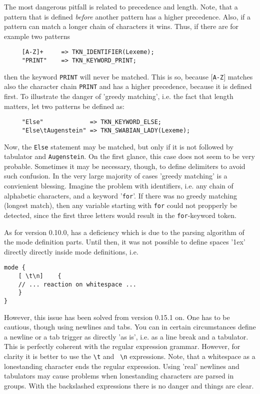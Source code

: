The most dangerous pitfall is related to precedence and length. Note, that a 
pattern that is defined {\it before} another pattern has a higher
precedence. Also, if a pattern can match a longer chain of characters it wins.
Thus, if there are for example two patterns

\begin{verbatim}
     [A-Z]+     => TKN_IDENTIFIER(Lexeme);
     "PRINT"    => TKN_KEYWORD_PRINT;
\end{verbatim}

then the keyword {\tt PRINT} will never be matched. This is so, because
$[${\tt A-Z}$]$ matches also the character chain {\tt PRINT} and has
a higher precedence, because it is defined first. To illustrate the
danger of 'greedy matching', i.e. the fact that length matters, let
two patterns be defined as:

\begin{verbatim}
     "Else"             => TKN_KEYWORD_ELSE;
     "Else\tAugenstein" => TKN_SWABIAN_LADY(Lexeme);
\end{verbatim}
Now, the {\tt Else} statement may be matched, but only if it is not
followed by tabulator and {\tt Augenstein}. On the first glance, this
case does not seem to be very probable. Sometimes it may be necessary,
     though, to define delimiters to avoid such confusion. In the very large majority of
     cases 'greedy matching' is a convienient blessing. Imagine the problem with 
     identifiers, i.e. any chain of alphabetic characters, and a keyword '{\tt for}'.
     If there was no greedy matching (longest match), then any variable starting
     with {\tt for} could not propperly be detected, since the first three letters
     would result in the {\tt for}-keyword token.

As for version 0.10.0, {\quex} has a deficiency which is due to the parsing algorithm
of the mode definition parts. Until then, it was not possible to define spaces '\kern 1ex' 
directly directly inside mode definitions, i.e.

\begin{verbatim}
mode {
    [ \t\n]    {
	// ... reaction on whitespace ...
    }
}
\end{verbatim}

However, this issue has been solved from version 0.15.1 on. One has to be
cautious, though using newlines and tabs.  You can in certain circumstances
define a newline or a tab trigger as directly 'as is', i.e. as a line break and
a tabulator.  This is perfectly coherent with the regular expression grammar.
However, for clarity it is better to use the {\tt \verb|\|t} and {\tt
    \verb|\|n} expressions. Note, that a whitespace as a lonestanding character
    ends the regular expression. Using 'real' newlines and tabulators may cause problems when lonestanding
    characters are parsed in groups. With the backslashed expressions there is
    no danger and things are clear.
